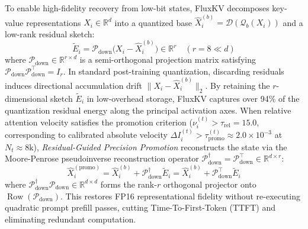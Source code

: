 \documentclass[10pt,twocolumn]{article}
\begin{document}
To enable high-fidelity recovery from low-bit states, FluxKV decomposes key-value representations $X_i \in \mathbb{R}^d$ into a quantized base $\hat{X}_i^{(b)} = \mathcal{D}(\mathcal{Q}_b(X_i))$ and a low-rank residual sketch:
\begin{equation}
    \tilde{E}_i = \mathcal{P}_{\text{down}} \big( X_i - \hat{X}_i^{(b)} \big) \in \mathbb{R}^r \quad (r = 8 \ll d)
\end{equation}
where $\mathcal{P}_{\text{down}} \in \mathbb{R}^{r \times d}$ is a semi-orthogonal projection matrix satisfying $\mathcal{P}_{\text{down}} \mathcal{P}_{\text{down}}^\top = I_r$. In standard post-training quantization, discarding residuals induces directional accumulation drift $\lVert X_i - \hat{X}_i^{(b)} \rVert_2$. By retaining the $r$-dimensional sketch $\tilde{E}_i$ in low-overhead storage, FluxKV captures over 94\% of the quantization residual energy along the principal activation axes. When relative attention velocity satisfies the promotion criterion ($\nu_i^{(t)} > \tau_{\text{rel}} = 15.0$, corresponding to calibrated absolute velocity $\Delta I_i^{(t)} > \tau_{\text{promo}}^{(t)} \approx 2.0 \times 10^{-3}$ at $N_t \approx 8\text{k}$), \textit{Residual-Guided Precision Promotion} reconstructs the state via the Moore-Penrose pseudoinverse reconstruction operator $\mathcal{P}_{\text{down}}^\dagger = \mathcal{P}_{\text{down}}^\top \in \mathbb{R}^{d \times r}$:
\begin{equation}
    \hat{X}_i^{(\text{promo})} = \hat{X}_i^{(b)} + \mathcal{P}_{\text{down}}^\dagger \tilde{E}_i = \hat{X}_i^{(b)} + \mathcal{P}_{\text{down}}^\top \tilde{E}_i
\end{equation}
where $\mathcal{P}_{\text{down}}^\dagger \mathcal{P}_{\text{down}} \in \mathbb{R}^{d \times d}$ forms the rank-$r$ orthogonal projector onto $\operatorname{Row}(\mathcal{P}_{\text{down}})$. This restores FP16 representational fidelity without re-executing quadratic prompt prefill passes, cutting Time-To-First-Token (TTFT) and eliminating redundant computation.
\end{document}
